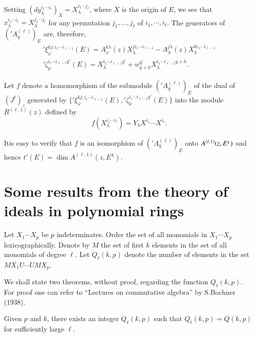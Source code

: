 Setting $(dy_{\lambda}^{i_1 \cdots i_{\ell}} )_X =
X_{\lambda}^{i_1\cdots j_{\ell}}$, where $X$ is the origin of $E$, we
see that $x_\lambda^{i_1 \cdots i_\ell}= X_\lambda^{j_1\cdots j_\ell}$
for any permutation $j_1, \ldots, j_{\ell}$ of 
$i_1, \cdots , i_{\ell}$. The generators of $('A^{(\ell)}_q)_E$ are,
therefore, 
\begin{gather*}
  '\xi_{\varphi}^{k j;i_1 \cdots i_{\ell -1}} (E) = A^{k
    \lambda}_{\varphi} (z) X_{\lambda}^{ ji_1 \cdots i_{\ell -1}} -
  A_{\lambda}^{j \lambda} (z) X_{\lambda}^{ki_1 \cdots i_{\ell -1}}\\ 
  {'\zeta}_{\mu}^{i_1 \cdots i_{\ell -1}q'} (E) = X_{\lambda}^{ i_1
    \cdots i_{\ell -1}q'} + w_{q+h}^{q'} X_{\lambda}^{i_1 \cdots
    i_{\ell -1}q+h}. 
\end{gather*}

Let $f$ denote a homomorphism of the submodule $('A^{(\ell)} _q)_E$ of
the dual of $(J^\ell)_z$ generated by $\{'\xi_{\varphi}^{k j;i_1
  \cdots i_{\ell -1}}(E), {'\zeta}_{\mu}^{i_1 \cdots i_{\ell -1}q'}
(E)\}$ into the module $\underbar{R}^{(\ell ,1)} (z)$ defined by 
$$
f(X_{\lambda}^{i_1 \cdots i_\ell}) = Y_{\lambda}{X^{i_1} \cdots X^{i_\ell}}.
$$

It\pageoriginale is easy to verify that $f$ is an isomorphism of
$('A^{(\ell)}_q)_E$ 
onto $A^{(\ell,1)}\break (z, E^{\chi})$ and hence $t' (E) = \dim A^{(\ell,
  1)} (z, E^{\chi})$. 

\section{Some results from the theory of ideals in polynomial
  rings}\label{chap3:sec3.10}%
 
Let $X_1 \cdots X_p$ be $p$ indeterminates. Order the set of all
monomials in $X_1 \cdots X_p$ lexicographically. Denote by $M$ the set
of first $k$ elements in the set of all monomials of degree
$\ell$. Let $Q_{\ell}(k,p)$ denote the number of elements in the set
$MX_1 U \cdots U MX_p$. 

We shall state two theorems, without proof, regarding the function
$Q_{\ell}(k, p)$. For proof one can refer to ``Lectures on commutative
algebra'' by S.Bochner (1938). 

\setcounter{theorem}{0}
\begin{theorem}\label{chap3:sec3.10:thm1}%
  Given $p$ and $k$, there exists an integer $Q_\ell (k, p)$ such that
  $Q_\ell (k, p) = Q(k, p)$ for sufficiently large $\ell$. 
\end{theorem}

